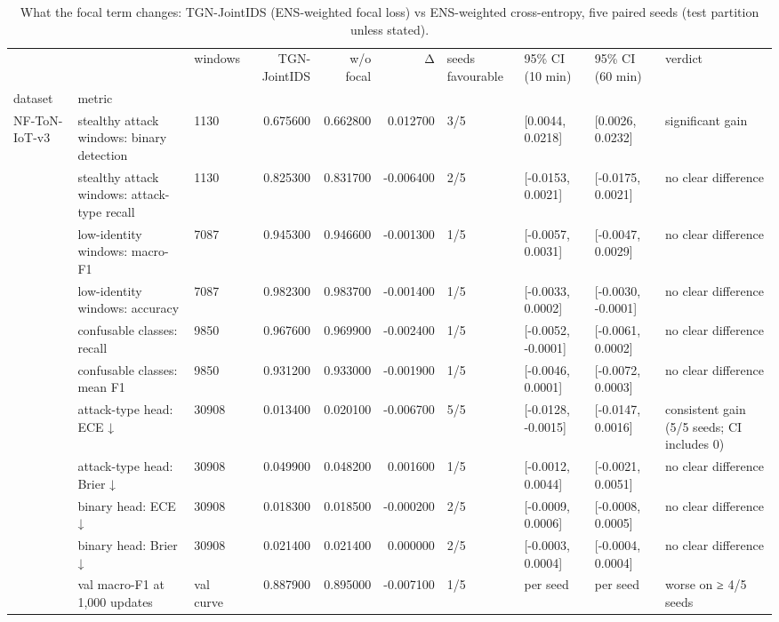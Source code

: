 \begin{table}
\caption{What the focal term changes: TGN-JointIDS (ENS-weighted focal loss) vs ENS-weighted cross-entropy, five paired seeds (test partition unless stated).}
\label{tab:focal}
\begin{tabular}{lllrrrllll}
\toprule
 &  & windows & TGN-JointIDS & w/o focal & Δ & seeds favourable & 95\% CI (10 min) & 95\% CI (60 min) & verdict \\
dataset & metric &  &  &  &  &  &  &  &  \\
\midrule
\multirow[t]{17}{*}{NF-ToN-IoT-v3} & stealthy attack windows: binary detection & 1130 & 0.675600 & 0.662800 & 0.012700 & 3/5 & [0.0044, 0.0218] & [0.0026, 0.0232] & significant gain \\
 & stealthy attack windows: attack-type recall & 1130 & 0.825300 & 0.831700 & -0.006400 & 2/5 & [-0.0153, 0.0021] & [-0.0175, 0.0021] & no clear difference \\
 & low-identity windows: macro-F1 & 7087 & 0.945300 & 0.946600 & -0.001300 & 1/5 & [-0.0057, 0.0031] & [-0.0047, 0.0029] & no clear difference \\
 & low-identity windows: accuracy & 7087 & 0.982300 & 0.983700 & -0.001400 & 1/5 & [-0.0033, 0.0002] & [-0.0030, -0.0001] & no clear difference \\
 & confusable classes: recall & 9850 & 0.967600 & 0.969900 & -0.002400 & 1/5 & [-0.0052, -0.0001] & [-0.0061, 0.0002] & no clear difference \\
 & confusable classes: mean F1 & 9850 & 0.931200 & 0.933000 & -0.001900 & 1/5 & [-0.0046, 0.0001] & [-0.0072, 0.0003] & no clear difference \\
 & attack-type head: ECE ↓ & 30908 & 0.013400 & 0.020100 & -0.006700 & 5/5 & [-0.0128, -0.0015] & [-0.0147, 0.0016] & consistent gain (5/5 seeds; CI includes 0) \\
 & attack-type head: Brier ↓ & 30908 & 0.049900 & 0.048200 & 0.001600 & 1/5 & [-0.0012, 0.0044] & [-0.0021, 0.0051] & no clear difference \\
 & binary head: ECE ↓ & 30908 & 0.018300 & 0.018500 & -0.000200 & 2/5 & [-0.0009, 0.0006] & [-0.0008, 0.0005] & no clear difference \\
 & binary head: Brier ↓ & 30908 & 0.021400 & 0.021400 & 0.000000 & 2/5 & [-0.0003, 0.0004] & [-0.0004, 0.0004] & no clear difference \\
 & val macro-F1 at 1,000 updates & val curve & 0.887900 & 0.895000 & -0.007100 & 1/5 & per seed & per seed & worse on ≥ 4/5 seeds \\

\end{tabular}
\end{table}
